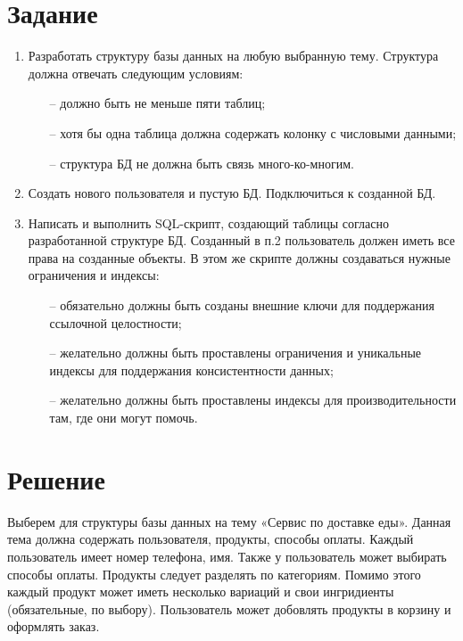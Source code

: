 \documentclass[a4paper,14pt]{extarticle}
\begin{document}
  \section*{Задание}
  \begin{enumerate}
    \item Разработать структуру базы данных на любую выбранную тему. Структура должна отвечать следующим условиям:
    \begin{itemize}
      \item[--] должно быть не меньше пяти таблиц;
      \item[--] хотя бы одна таблица должна содержать колонку с числовыми данными;
      \item[--] структура БД не должна быть связь много-ко-многим.
    \end{itemize}
    \item Создать нового пользователя и пустую БД. Подключиться к созданной БД.
    \item Написать и выполнить SQL-скрипт, создающий таблицы согласно разработанной структуре БД. Созданный в п.2 пользователь должен иметь все права на созданные объекты. В этом же скрипте должны создаваться нужные ограничения и индексы:
    \begin{itemize}
      \item[--] обязательно должны быть созданы внешние ключи для поддержания ссылочной целостности;
      \item[--] желательно должны быть проставлены ограничения и уникальные индексы для поддержания консистентности данных;
      \item[--] желательно должны быть проставлены индексы для производительности там, где они могут помочь.
    \end{itemize}

  \end{enumerate}

  \pagebreak
  \section*{Решение}
  Выберем для структуры базы данных на тему «Сервис по доставке еды». Данная тема должна содержать пользователя, продукты, способы оплаты. Каждый пользователь имеет номер телефона, имя. Также у пользователь может выбирать способы оплаты. Продукты следует разделять по категориям. Помимо этого каждый продукт может иметь несколько вариаций и свои ингридиенты (обязательные, по выбору). Пользователь может добовлять продукты в корзину и оформлять заказ.
\end{document}
